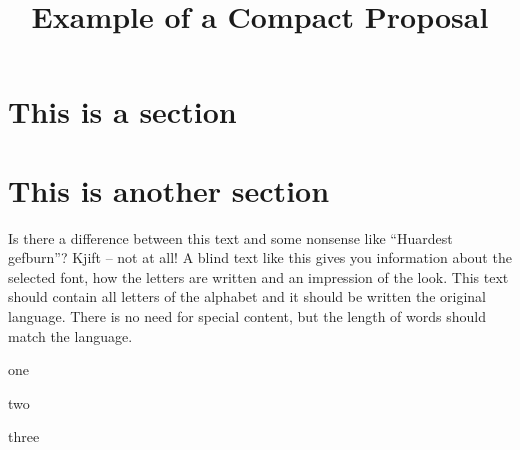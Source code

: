 \documentclass[draft, nonotes]{compactproposal}
\title{Example of a Compact Proposal}
\begin{document}
 
\maketitle

\section{This is a section}

\blindtext[4]

\section{This is another section}



Is there a difference between this text and some nonsense like “Huardest gefburn”? Kjift – not at all! 
A blind text like this gives you information about the selected font, how the letters are written and an impression of the look.
This text should contain all letters of the alphabet and it should be written  the original language. 
There is no need for special content, but the length of words should match the language. 

\begin{tightitemize}
	\item one
	\item two
	\item three
\end{tightitemize}

\blindtext[4]
\end{document}
